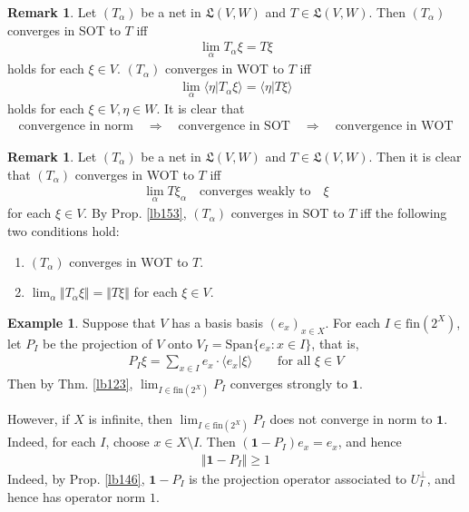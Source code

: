 \documentclass[12pt,b5paper,notitlepage]{article}
\theoremstyle{definition}
\newtheorem{eg}[df]{Example}
\newtheorem{rem}[df]{Remark}
\theoremstyle{plain}
\newcommand{\fk}{\mathfrak}
\newcommand{\idt}{\mathbf{1}}
\newcommand{\Span}{\mathrm{Span}}
\newcommand{\bk}[1]{\langle {#1}\rangle}
\newcommand{\fin}{\mathrm{fin}}
\newcommand{\hqed}{\hfill\qedsymbol}
\numberwithin{equation}{section}
\begin{document}
\begin{rem}
Let $(T_\alpha)$ be a net in $\fk L(V,W)$ and $T\in\fk L(V,W)$. Then $(T_\alpha)$ converges in SOT to $T$ iff
\begin{align}
\lim_\alpha T_\alpha\xi=T\xi
\end{align}
holds for each $\xi\in V$. $(T_\alpha)$ converges in WOT to $T$ iff
\begin{align}
\lim_\alpha \bk{\eta|T_\alpha\xi}=\bk{\eta|T\xi}
\end{align}
holds for each $\xi\in V,\eta\in W$. It is clear that
\begin{align*}
\text{convergence in norm}\quad\Rightarrow\quad\text{convergence in SOT}\quad\Rightarrow\quad\text{convergence in WOT}
\end{align*}
\end{rem}


\begin{rem}
Let $(T_\alpha)$ be a net in $\fk L(V,W)$ and $T\in\fk L(V,W)$. Then it is clear that $(T_\alpha)$ converges in WOT to $T$ iff
\begin{align*}
\lim_\alpha T\xi_\alpha\quad\text{converges weakly to}\quad\xi
\end{align*}
for each $\xi\in V$. By Prop. \ref{lb153}, $(T_\alpha)$ converges in SOT to $T$ iff the following two conditions hold:
\begin{enumerate}[label=(\arabic*)]
\item $(T_\alpha)$ converges in WOT to $T$.
\item $\lim_\alpha \Vert T_\alpha\xi\Vert=\Vert T\xi\Vert$ for each $\xi\in V$.
\end{enumerate}
\end{rem}


\begin{eg}\label{lb157}
Suppose that $V$ has a basis basis $(e_x)_{x\in X}$. For each $I\in\fin(2^X)$, let $P_I$ be the projection of $V$ onto $V_I=\Span\{e_x:x\in I\}$, that is,
\begin{align*}
P_I\xi=\sum_{x\in I}e_x\cdot\bk{e_x|\xi}\qquad\text{for all }\xi\in V
\end{align*}
Then by Thm. \ref{lb123}, $\lim_{I\in\fin(2^X)}P_I$ converges strongly to $\idt$. 

However, if $X$ is infinite, then $\lim_{I\in\fin(2^X)}P_I$ does not converge in norm to $\idt$. Indeed, for each $I$, choose $x\in X\setminus I$. Then $(\idt-P_I)e_x=e_x$, and hence
\begin{align*}
\Vert\idt-P_I\Vert\geq 1
\end{align*}
Indeed, by Prop. \ref{lb146}, $\idt-P_I$ is the projection operator associated to $U_I^\perp$, and hence has operator norm $1$.  \hqed
\end{eg}
\end{document}
